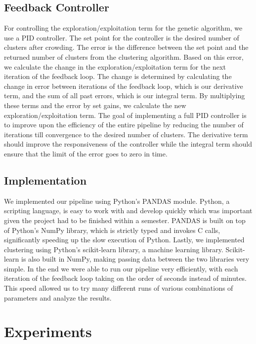 \documentclass{sig-alternate}
\begin{document}
\subsection{Feedback Controller}
For controlling the exploration/exploitation term for the genetic algorithm, we use a PID controller. The set point for the controller is the desired number of clusters after crowding. The error is the difference between the set point and the returned number of clusters from the clustering algorithm. Based on this error, we calculate the change in the exploration/exploitation term for the next iteration of the feedback loop. The change is determined by calculating the change in error between iterations of the feedback loop, which is our derivative term, and the sum of all past errors, which is our integral term. By multiplying these terms and the error by set gains, we calculate the new exploration/exploitation term. The goal of implementing a full PID controller is to improve upon the efficiency of the entire pipeline by reducing the number of iterations till convergence to the desired number of clusters. The derivative term should improve the responsiveness of the controller while the integral term should ensure that the limit of the error goes to zero in time.

\subsection{Implementation}
We implemented our pipeline using Python's PANDAS module. Python, a scripting language, is easy to work with and develop quickly which was important given the project had to be finished within a semester. PANDAS is built on top of Python's NumPy library, which is strictly typed and invokes C calls, significantly speeding up the slow execution of Python. Lastly, we implemented clustering using Python's scikit-learn library, a machine learning library. Scikit-learn is also built in NumPy, making passing data between the two libraries very simple. In the end we were able to run our pipeline very efficiently, with each iteration of the feedback loop taking on the order of seconds instead of minutes. This speed allowed us to try many different runs of various combinations of parameters and analyze the results.

\section{Experiments}
\end{document}
